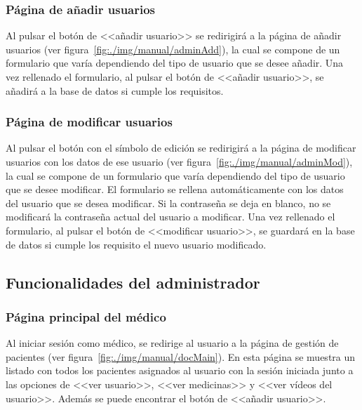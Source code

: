 
\subsubsection{Página de añadir usuarios}

Al pulsar el botón de <<añadir usuario>> se redirigirá a la página de añadir usuarios (ver figura~\ref{fig:./img/manual/adminAdd}), la cual se compone de un formulario que varía dependiendo del tipo de usuario que se desee añadir. Una vez rellenado el formulario, al pulsar el botón de <<añadir usuario>>, se añadirá a la base de datos si cumple los requisitos.


\subsubsection{Página de modificar usuarios}

Al pulsar el botón con el símbolo de edición se redirigirá a la página de modificar usuarios con los datos de ese usuario (ver figura~\ref{fig:./img/manual/adminMod}), la cual se compone de un formulario que varía dependiendo del tipo de usuario que se desee modificar. El formulario se rellena automáticamente con los datos del usuario que se desea modificar. Si la contraseña se deja en blanco, no se modificará la contraseña actual del usuario a modificar. Una vez rellenado el formulario, al pulsar el botón de <<modificar usuario>>, se guardará en la base de datos si cumple los requisito el nuevo usuario modificado.


\subsection{Funcionalidades del administrador}

\subsubsection{Página principal del médico}

Al iniciar sesión como médico, se redirige al usuario a la página de gestión de pacientes (ver figura~\ref{fig:./img/manual/docMain}). En esta página se muestra un listado con todos los pacientes asignados al usuario con la sesión iniciada junto a las opciones de <<ver usuario>>, <<ver medicinas>> y <<ver vídeos del usuario>>. Además se puede encontrar el botón de <<añadir usuario>>.

